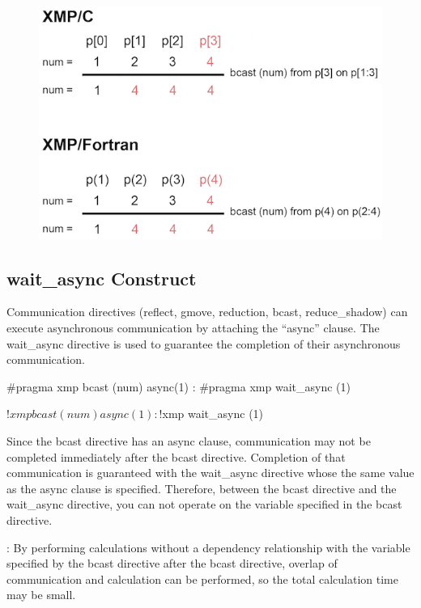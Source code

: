 \begin{figure}
  \centering
  \includegraphics{figs/bcast_from_on.png}
\end{figure}


\subsection{{\bf wait\_async} Construct}

Communication directives (reflect, gmove, reduction, bcast,
reduce\_shadow) can execute asynchronous communication by attaching the
“async” clause. The wait\_async directive is used to guarantee the
completion of their asynchronous communication.

\begin{XCexample}
#pragma xmp bcast (num) async(1)
    :
#pragma xmp wait_async (1)
\end{XCexample}

\begin{XFexample}
!$xmp bcast (num) async(1)
        :
!$xmp wait_async (1)
\end{XFexample}

Since the bcast directive has an async clause, communication may not be
completed immediately after the bcast directive. Completion of that
communication is guaranteed with the wait\_async directive whose the same
value as the async clause is specified. Therefore, between the bcast
directive and the wait\_async directive, you can not operate on the
variable specified in the bcast directive.

\noindent\hrulefill

: By performing calculations without a dependency
relationship with the variable specified by the bcast directive after
the bcast directive, overlap of communication and calculation can be
performed, so the total calculation time may be small.

